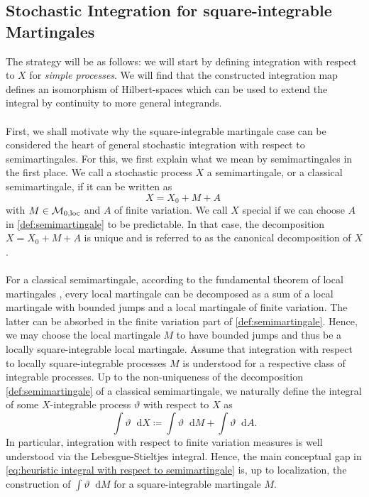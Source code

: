 \documentclass[11pt,a4paper,twoside,openany]{report}
\newcommand{\diff}{\mathop{}\!\mathrm{d}}
\theoremstyle{plain} %
\theoremstyle{definition} %
\theoremstyle{remark} %
\let\parencite\authnumparencite
\begin{document}
\subsection{Stochastic Integration for square-integrable Martingales}\label{sec:Stochastic Integration for square-integrable Martingales}
The strategy will be as follows: we will start by defining integration with respect to \(X\) for \textit{simple processes}. We will find that the constructed integration map defines an isomorphism of Hilbert-spaces which can be used to extend the integral by continuity to more general integrands.
\\\\
 First, we shall motivate why the square-integrable martingale case can be considered the heart of general stochastic integration with respect to semimartingales. For this, we first explain what we mean by semimartingales in the first place.
We call a stochastic process \(X\) a semimartingale, or a classical semimartingale, if it can be written as 
\begin{equation}\label{def:semimartingale}
    X = X_0+M+A\;
\end{equation}
with \(M\in\mathcal{M}_{0,\rm{loc}}\) and \(A\) of finite variation. We call \(X\) special if we can choose \(A\) in \cref{def:semimartingale} to be predictable. In that case, the decomposition \(X=X_0+M+A\) is unique and is referred to as the canonical decomposition of \(X\).
\\\\
For a classical semimartingale, according to the fundamental theorem of local martingales \parencite[Thm.~29,Ch.III]{Protter2005StochasticIntegration}, every local martingale can be decomposed as a sum of a local martingale with bounded jumps and a local martingale of finite variation. The latter can be absorbed in the finite variation part of \cref{def:semimartingale}. Hence, we may choose the local martingale \(M\) to have bounded jumps and thus be a locally square-integrable local martingale. Assume that integration with respect to locally square-integrable processes \(M\) is understood for a respective class of integrable processes. Up to the non-uniqueness of the decomposition \cref{def:semimartingale} of a classical semimartingale, we naturally define the integral of some \(X\)-integrable process \(\vartheta\) with respect to \(X\) as 
\begin{equation}\label{eq:heuristic integral with respect to semimartingale}
    \int \vartheta\diff X\coloneqq\int \vartheta\diff M+\int \vartheta\diff A.
\end{equation}
In particular, integration with respect to finite variation measures is well understood via the Lebesgue-Stieltjes integral. Hence, the main conceptual gap in \cref{eq:heuristic integral with respect to semimartingale} is, up to localization, the construction of \(\int \vartheta\diff M\) for a square-integrable martingale \(M\).
\end{document}
